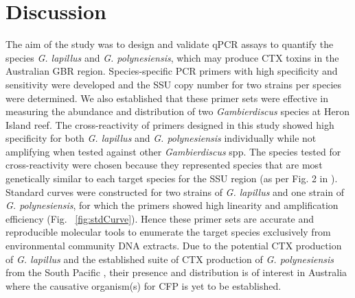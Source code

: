 \documentclass[12pt]{article}
\begin{document}
\newpage
\section*{Discussion}
The aim of the study was to design and validate qPCR assays to quantify the species \emph{G. lapillus} and \emph{G. polynesiensis}, which may produce CTX toxins in the Australian GBR region. 
Species-specific PCR primers with high specificity and sensitivity were developed and the SSU copy number for two strains per species were determined. We also established that these primer sets were effective in measuring the abundance and distribution of two \emph{Gambierdiscus} species at Heron Island reef. The cross-reactivity of primers designed in this study showed high specificity for both \emph{G. lapillus} and \emph{G. polynesiensis} individually while not amplifying when tested against other \emph{Gambierdiscus} spp. The species tested for cross-reactivity were chosen because they represented species that are most genetically similar to each target species for the SSU region (as per Fig. 2 in \citep{kretzschmar2016characterization}).
Standard curves were constructed for two strains of \emph{G. lapillus} and one strain of \emph{G. polynesiensis}, for which the primers showed high linearity and amplification efficiency (Fig. ~\ref{fig:stdCurve}). Hence these primer sets are accurate and reproducible molecular tools to enumerate the target species exclusively from environmental community DNA extracts.
Due to the potential CTX production of \emph{G. lapillus} \citep{kretzschmar2016characterization} and the established suite of CTX production of \emph{G. polynesiensis} from the South Pacific \citep{chinain2010growth}, their presence and distribution is of interest in Australia where the causative organism(s) for CFP is yet to be established.\\

\end{document}
